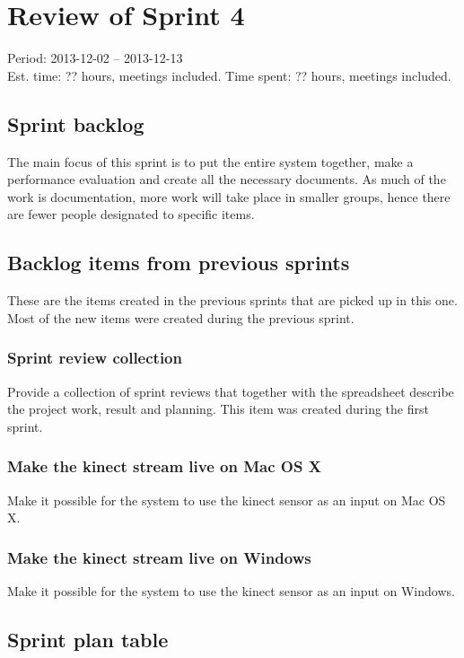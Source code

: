 \section{Review of Sprint 4}
\label{sec:about}
\large Period: 2013-12-02 -- 2013-12-13 \\ 
\large Est. time: ?? hours, meetings included.
\large Time spent: ?? hours, meetings included.

\subsection{Sprint backlog}
The main focus of this sprint is to put the entire system together, make a performance evaluation and create all the necessary documents. As much of the work is documentation, more work will take place in smaller groups, hence there are fewer people designated to specific items.

\subsection{Backlog items from previous sprints}
These are the items created in the previous sprints that are picked up in this one. Most of the new items were created during the previous sprint.

\subsubsection{Sprint review collection}
Provide a collection of sprint reviews that together with the spreadsheet describe the project work, result and planning. This item was created during the first sprint.

\subsubsection{Make the kinect stream live on Mac OS X}
Make it possible for the system to use the kinect sensor as an input on Mac OS X.

\subsubsection{Make the kinect stream live on Windows}
Make it possible for the system to use the kinect sensor as an input on Windows.



\newpage

\subsection{Sprint plan table}

